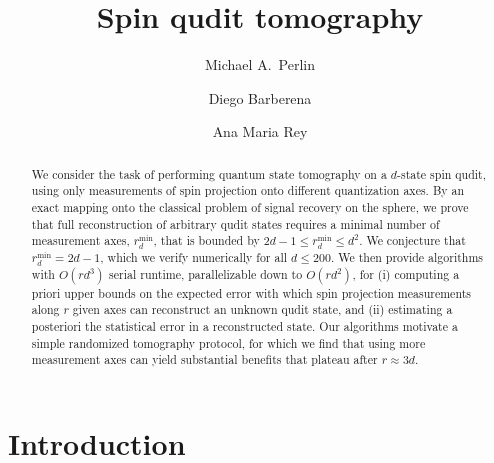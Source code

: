 \documentclass[a4paper,twocolumn,unpublished]{quantumarticle}
\renewcommand{\t}{\text} %
\newcommand{\p}[1]{\left(#1\right)} %
\begin{document}
\title{Spin qudit tomography}
\author[]{Michael A.~Perlin}
\author[]{Diego Barberena}
\author[]{Ana Maria Rey}


\begin{abstract}
  We consider the task of performing quantum state tomography on a $d$-state spin qudit, using only measurements of spin projection onto different quantization axes.
  By an exact mapping onto the classical problem of signal recovery on the sphere, we prove that full reconstruction of arbitrary qudit states requires a minimal number of measurement axes, $r_d^{\t{min}}$, that is bounded by $2d-1\le r_d^{\t{min}}\le d^2$.
  We conjecture that $r_d^{\t{min}}=2d-1$, which we verify numerically for all $d\le200$.
  We then provide algorithms with $O\p{rd^3}$ serial runtime, parallelizable down to $O\p{rd^2}$, for (i) computing a priori upper bounds on the expected error with which spin projection measurements along $r$ given axes can reconstruct an unknown qudit state, and (ii) estimating a posteriori the statistical error in a reconstructed state.
  Our algorithms motivate a simple randomized tomography protocol, for which we find that using more measurement axes can yield substantial benefits that plateau after $r\approx3d$.
\end{abstract}

\maketitle

\section{Introduction}
\end{document}
